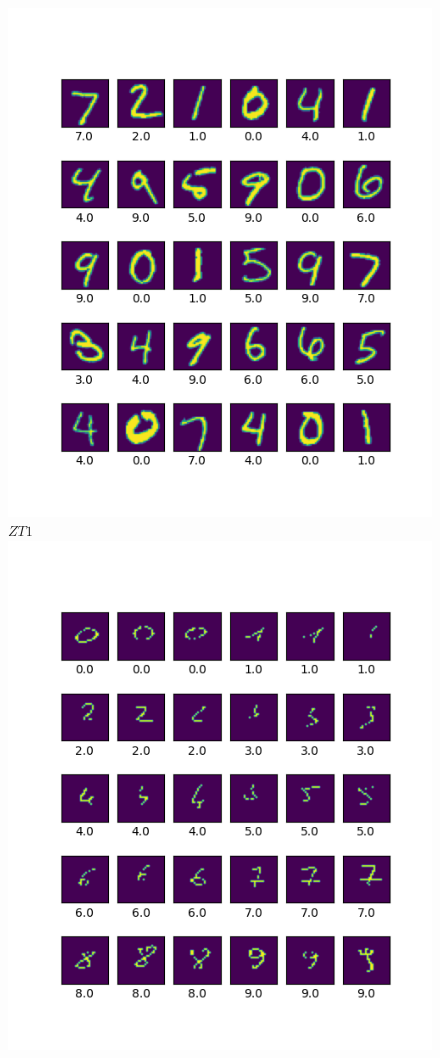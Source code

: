 \begin{figure}[!htb]
    \centering
    \includegraphics[width=\linewidth]{dataset_mnist.png}
    $ZT1$
\endminipage\hfill
{}
    \centering
    \includegraphics[width=\linewidth]{dataset_my.png}

\end{figure}
